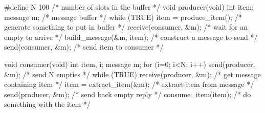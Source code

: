 \documentclass[varwidth=38em,crop]{standalone}
\begin{document}
\begin{ccode} 
#define N 100  /* number of slots in the buffer */
void producer(void)
{
    int item;
    message m;                    /* message buffer */
    while (TRUE) {
        item = produce_item();    /* generate something to put in buffer */
        receive(consumer, &m);    /* wait for an empty to arrive */
        build_message(&m, item);  /* construct a message to send */
        send(consumer, &m);       /* send item to consumer */
    }
}

void consumer(void)
{
    int item, i;
    message m;
    for (i=0; i<N; i++) send(producer, &m);  /* send N empties */
    while (TRUE) {
        receive(producer, &m);    /* get message containing item */
        item = extract_item(&m);  /* extract item from message */
        send(producer, &m);       /* send back empty reply */
        consume_item(item);       /* do something with the item */
    }
}
\end{ccode}
\end{document}
